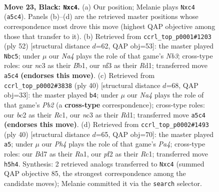 \documentclass[11pt]{article}
\begin{document}
\clearpage

\begin{figure}[p]\centering
\begin{subfigure}{0.46\textwidth}\centering
\resizebox{\linewidth}{!}{%
\newchessgame
\chessboard[
  setfen={r4r1b/1ppb1k2/p7/n3pp1p/2P5/P1N2N2/1PB1KPP1/R1B4R b - - 2 23},
  showmover=false,
  pgfstyle=straightmove, color=movearrow, markmove={a5-c4}
]}
\caption{}
\end{subfigure}\hfill
\begin{subfigure}{0.46\textwidth}\centering
\resizebox{\linewidth}{!}{%
\newchessgame
\chessboard[
  setfen={4br1k/1pr3p1/7p/p2np3/Pn2N3/1N5P/1P3PP1/1B1R1RK1 w - - 0 27},
  showmover=false,
  pgfstyle=straightmove, color=movearrow, markmove={b3-c5}
]}
\caption{}
\end{subfigure}
\\[4pt]
\begin{subfigure}{0.46\textwidth}\centering
\resizebox{\linewidth}{!}{%
\newchessgame
\chessboard[
  setfen={r7/pp2kppp/2p2n2/4rb2/N7/P3P3/1P2BPPP/2RR2K1 w - - 6 21},
  showmover=false,
  pgfstyle=straightmove, color=movearrow, markmove={b2-b4}
]}
\caption{}
\end{subfigure}\hfill
\begin{subfigure}{0.46\textwidth}\centering
\resizebox{\linewidth}{!}{%
\newchessgame
\chessboard[
  setfen={r2r4/1pp2kp1/3b1n2/7p/P2PpP1P/2N3P1/1P1BK3/R1R5 w - - 3 21},
  showmover=false,
  pgfstyle=straightmove, color=movearrow, markmove={a4-a5}
]}
\caption{}
\end{subfigure}
\caption{\textbf{Move 23, Black: \texttt{Nxc4}.} (a) Our position; Melanie plays \texttt{Nxc4} (\texttt{a5c4}). Panels (b)--(d) are the retrieved master positions whose correspondence most drove this move (highest QAP objective among those that transfer to it). (b) Retrieved from \texttt{ccrl\_top\_p0001\#1203} (ply 52) [structural distance $d$=62, QAP obj=53]: the master played \texttt{Nbc5}; under $\mu$ our \emph{Na4} plays the role of that game's \emph{Nb3}; cross-type roles: our \emph{n}c3 as their \emph{B}b1, our \emph{n}f3 as their \emph{R}d1; transferred move \texttt{a5c4} \textbf{(endorses this move)}. (c) Retrieved from \texttt{ccrl\_top\_p0002\#3838} (ply 40) [structural distance $d$=68, QAP obj=33]: the master played \texttt{b4}; under $\mu$ our \emph{Na4} plays the role of that game's \emph{Pb2} (a \textbf{cross-type} correspondence); cross-type roles: our \emph{b}c2 as their \emph{R}c1, our \emph{n}c3 as their \emph{R}d1; transferred move \texttt{a5c4} \textbf{(endorses this move)}. (d) Retrieved from \texttt{ccrl\_top\_p0002\#1493} (ply 40) [structural distance $d$=65, QAP obj=70]: the master played \texttt{a5}; under $\mu$ our \emph{Ph4} plays the role of that game's \emph{Pa4}; cross-type roles: our \emph{B}d7 as their \emph{R}a1, our \emph{p}f2 as their \emph{R}c1; transferred move \texttt{h5h4}. Synthesis: 2 retrieved analogs transferred to \texttt{Nxc4} (summed QAP objective 85, the strongest correspondence among the candidate moves); Melanie committed it via the \texttt{search} selector.}
\label{fig:thought-m45}
\end{figure}
\end{document}
